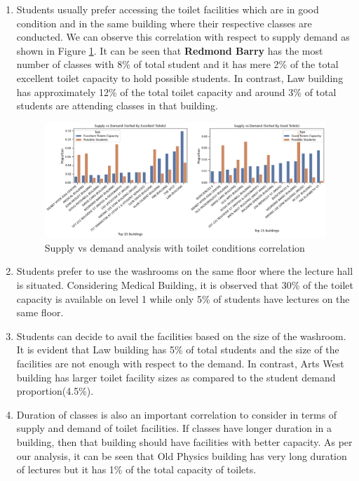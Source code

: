 \begin{enumerate}
    \item Students usually prefer accessing the toilet facilities which are in good condition and in the same building where their respective classes are conducted. We can observe this correlation with respect to supply demand as shown in Figure \ref{toilet}. It can be seen that \textbf{Redmond Barry} has the most number of classes with 8\% of total student and it has mere 2\% of the total excellent toilet capacity to hold possible students. In contrast, Law building has approximately 12\% of the total toilet capacity and around 3\% of total students are attending classes in that building.
    
    \begin{figure}[H]
    \centering
    \includegraphics[width=15cm]{resources/images/snap-10.png}
    \caption{Supply vs demand analysis with toilet conditions correlation}
    \label{toilet}
\end{figure}

    \item Students prefer to use the washrooms on the same floor where the lecture hall is situated. Considering Medical Building, it is observed that 30\% of the toilet capacity is available on level 1 while only 5\% of students have lectures on the same floor.
    
    
    \item Students can decide to avail the facilities based on the size of the washroom. It is evident that Law building has 5\% of total students and the size of the facilities are not enough with respect to the demand. In contrast, Arts West building has larger toilet facility sizes as compared to the student demand proportion(4.5\%).
    
    \item Duration of classes is also an important correlation to consider in terms of supply and demand of toilet facilities. If classes have longer duration in a building, then that building should have facilities with better capacity. As per our analysis, it can be seen that Old Physics building has very long duration of lectures but it has 1\% of the total capacity of toilets.
    
\end{enumerate}
